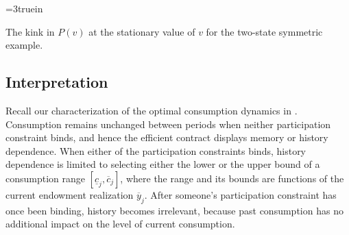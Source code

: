 



\centerline{\epsfxsize=3truein}
\caption{The kink in $P(v)$ at the stationary value of $v$ for the two-state symmetric
example.}
\endfigure


\subsection{Interpretation}
Recall our characterization of the optimal consumption dynamics in
. Consumption remains unchanged between periods when
neither participation constraint binds, and hence the efficient
contract displays memory or history dependence. When either of the
participation constraints binds, history dependence is limited to
 selecting either the lower or the upper bound of a
consumption range $[\underline c_j, \overline c_j]$, where the
range and its bounds are functions of the current endowment
realization $\overline y_j$. After someone's participation
constraint has once been binding, history becomes irrelevant,
because past consumption has no additional impact on the level of
current consumption. %
%

